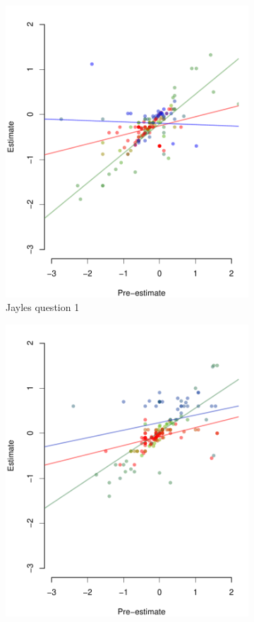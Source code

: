 \documentclass[9pt,twoside,lineno]{pnas-new}
\begin{document}
\begin{figure}[htbp]
	\centering
	\begin{subfigure}[b]{.24\textwidth}
		\includegraphics[width=\textwidth]{../plots/jayles1_vs_xp.pdf}
		\caption{Jayles question 1}
	\end{subfigure}
	\begin{subfigure}[b]{.24\textwidth}
		\includegraphics[width=\textwidth]{../plots/jayles2_vs_xp.pdf}

\end{subfigure}
\end{figure}
\end{document}
